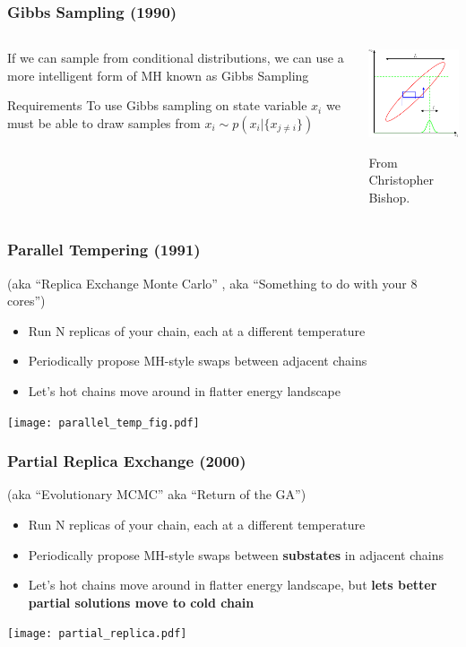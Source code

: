 \documentclass[compress]{beamer}
\begin{document}
\begin{frame}
  \frametitle{Gibbs Sampling (1990) }
  \begin{columns}
    \begin{column}{5cm}
      If we can sample from conditional distributions, we can 
      use a more intelligent form of MH known as Gibbs Sampling  \cite{Geman_Stochastic_1990}
      \pause
      \begin{alertblock}{Requirements}
        To use Gibbs sampling on state variable $x_i$ we must be able
        to draw samples from $x_i \sim p(x_i | \{x_{j \neq i}\})$
      \end{alertblock}
    \end{column}
    
    \begin{column}{5cm}
      \includegraphics[width=5cm]{notmine/Bishop_Figure11-11}

      From Christopher Bishop. 
    \end{column}
  \end{columns}

\end{frame}


\begin{frame}
  \frametitle{Parallel Tempering (1991) } 
  (aka ``Replica Exchange Monte Carlo'' \cite{Swendsen_Replica_1986}, aka ``Something to do with your 8 cores'')
  \begin{itemize}
  \item Run N replicas of your chain, each at a different temperature
  \item Periodically propose MH-style swaps between adjacent chains
  \item Let's hot chains move around in flatter energy landscape
  \end{itemize}
  \texttt{[image: parallel\_temp\_fig.pdf]}
\end{frame}

\begin{frame}
  \frametitle{Partial Replica Exchange (2000)}
  (aka ``Evolutionary MCMC'' \cite{Liang_Evolutionary_2000} aka ``Return of the GA'')
  \begin{itemize}
  \item Run N replicas of your chain, each at a different temperature
  \item Periodically propose MH-style swaps between \textbf{substates} in adjacent chains
  \item Let's hot chains move around in flatter energy landscape, but \textbf{lets better partial solutions move to cold chain}
  \end{itemize}
  \texttt{[image: partial\_replica.pdf]}
  
\end{frame}
\end{document}
